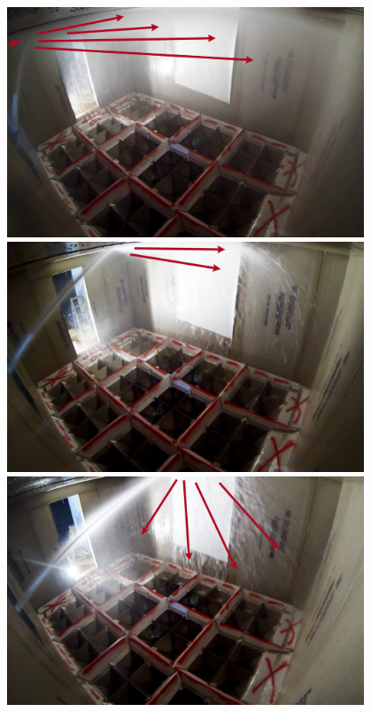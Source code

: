 \documentclass[12pt,oneside]{book}
\begin{document}
\begin{figure}[H]
	\centering
	\begin{minipage}[b]{.45\textwidth}
		\centering
		\includegraphics[width=0.95\textwidth]{Figures/Water_Distribution/Nozzle_Directions/Exterior_MaxAngleCeiling_SS_Arrows.png} 
	\end{minipage}
	\begin{minipage}[b]{.45\textwidth}
		\centering
		\includegraphics[width=0.95\textwidth]{Figures/Water_Distribution/Nozzle_Directions/Exterior_MidCeiling_SS_Arrows.png}
	\end{minipage}
	\begin{minipage}[b]{0.45\textwidth}
		\centering
		\includegraphics[width=0.95\textwidth]{Figures/Water_Distribution/Nozzle_Directions/Exterior_MinAngleCeiling_SS_FirstFloor_Arrows.png}

\end{minipage}
\end{figure}
\end{document}
